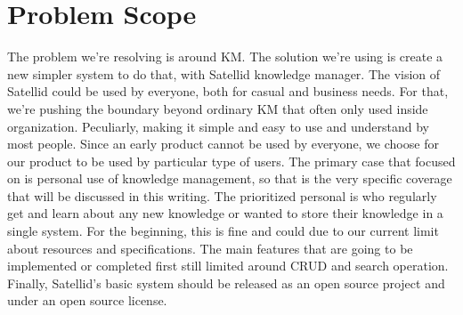 \section{Problem Scope}
\label{sec:problem-scope}

The problem we're resolving is around \ac{KM}.
The solution we're using is create a new simpler system to do that, with Satellid knowledge manager.
The vision of Satellid could be used by everyone, both for casual and business needs.
For that, we're pushing the boundary beyond ordinary \ac{KM} that often only used inside organization.
Peculiarly, making it simple and easy to use and understand by most people.
Since an early product cannot be used by everyone, we choose for our product to be used by particular type of users.
The primary case that focused on is personal use of knowledge management, so that is the very specific coverage that will be discussed in this writing.
The prioritized personal is who regularly get and learn about any new knowledge or wanted to store their knowledge in a single system.
For the beginning, this is fine and could due to our current limit about resources and specifications.
The main features that are going to be implemented or completed first still limited around \ac{CRUD} and search operation.
Finally, Satellid's basic system should be released as an open source project and under an open source license.
